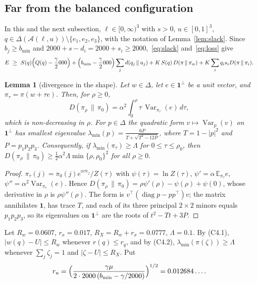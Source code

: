 \documentclass[11pt]{article}
\newtheorem{lemma}{Lemma}[section]
\theoremstyle{definition}
\numberwithin{equation}{section}
\newcommand{\one}{\mathbf 1}
\newcommand{\KLb}[2]{d(#1\,\|\,#2)}
\newcommand{\KL}[2]{D(#1\,\|\,#2)}
\newcommand{\Azero}{2000}
\newcommand{\cA}{\mathcal A}
\newcommand{\Var}{\operatorname{Var}}
\newcommand{\bmin}{b_{\min}}
\begin{document}
\subsection{Far from the balanced configuration}

In this and the next subsection, $\ell\in[0,\infty)^3$ with $s>0$, $u\in[0,1]^3$, $q\in\Delta(\cA(\ell,u))\setminus\{e_1,e_2,e_3\}$,
with the notation of Lemma~\ref{lem:slack}. Since $b_j\ge\bmin$ and $\Azero+s-d_i=\Azero+s_i\ge\Azero$,~\eqref{eq:slack}
and~\eqref{eq:loss} give
\begin{equation}\label{eq:far}
E\ \ge\ S(q)\Bigl(Q(q)-\frac\gamma\Azero\Bigr)+\Bigl(\bmin-\frac\gamma\Azero\Bigr)\sum_j\KLb{q_j}{u_j}+K\,S(q)\,\KL\pi{\pi_w}+K\sum_iq_is_i\KL\pi{\pi_i}.
\end{equation}

\begin{lemma}[divergence in the shape]\label{lem:expfam}
Let $w\in\Delta$, let $e\in\one^\perp$ be a unit vector, and $\pi_\tau=\pi(w+\tau e)$. Then, for $\rho\ge0$,
\[
\KL{\pi_\rho}{\pi_0}=\alpha^2\int_0^\rho\tau\,\Var_{\pi_\tau}(e)\,d\tau ,
\]
which is non-decreasing in $\rho$. For $p\in\Delta$ the quadratic form $v\mapsto\Var_p(v)$ on $\one^\perp$ has smallest eigenvalue
$\lambda_{\min}(p)=\frac{6P}{T+\sqrt{T^2-12P}}$, where $T=1-|p|^2$ and $P=p_1p_2p_3$. Consequently, if $\lambda_{\min}(\pi_\tau)\ge\Lambda$ for
$0\le\tau\le\rho_0$, then $\KL{\pi_\rho}{\pi_0}\ge\frac12\alpha^2\Lambda\min\{\rho,\rho_0\}^2$ for all $\rho\ge0$.
\end{lemma}
\begin{proof}
$\pi_\tau(j)=\pi_0(j)e^{\alpha\tau e_j}/Z(\tau)$ with $\psi(\tau)=\ln Z(\tau)$, $\psi'=\alpha\,\mathbb E_{\pi_\tau}e$,
$\psi''=\alpha^2\Var_{\pi_\tau}(e)$. Hence $\KL{\pi_\rho}{\pi_0}=\rho\psi'(\rho)-\psi(\rho)+\psi(0)$, whose derivative in $\rho$ is
$\rho\psi''(\rho)$. The form is $v^\top(\operatorname{diag}p-pp^\top)v$; the matrix annihilates $\one$, has trace $T$, and each of its three
principal $2\times2$ minors equals $p_1p_2p_3$, so its eigenvalues on $\one^\perp$ are the roots of $t^2-Tt+3P$.
\end{proof}

Let $R_w=0.0607$, $r_x=0.017$, $R_X=R_w+r_x=0.0777$, $\Lambda=0.1$. By (C4.1), $|w(q)-U|\le R_w$ whenever $r(q)\le r_q$, and by (C4.2),
$\lambda_{\min}(\pi(\zeta))\ge\Lambda$ whenever $\sum_j\zeta_j=1$ and $|\zeta-U|\le R_X$. Put
\[
r_u=\Bigl(\frac{\gamma\mu}{2\cdot\Azero\,(\bmin-\gamma/\Azero)}\Bigr)^{1/2}=0.012684\ldots .
\]
\end{document}
